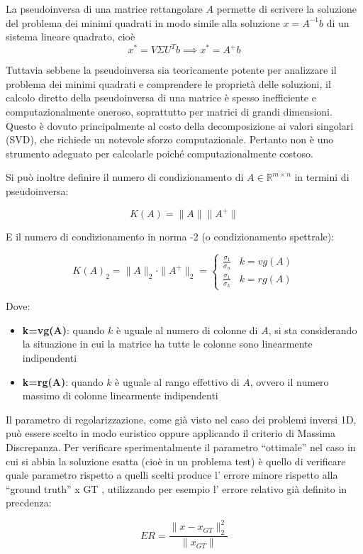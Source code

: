 La pseudoinversa di una matrice rettangolare $A$ permette di scrivere la soluzione del problema dei minimi quadrati in modo simile alla soluzione $x=A^{-1}b$ di un sistema lineare quadrato, cioè
\[
    x^* = V\Sigma U^T b \implies x^* = A^+ b
\]

Tuttavia sebbene la pseudoinversa sia teoricamente potente per analizzare il problema dei minimi quadrati e comprendere le proprietà delle soluzioni, il calcolo diretto della pseudoinversa di una matrice è spesso inefficiente e computazionalmente oneroso, soprattutto per matrici di grandi dimensioni. Questo è dovuto principalmente al costo della decomposizione ai valori singolari (SVD), che richiede un notevole sforzo computazionale. Pertanto non è uno strumento adeguato per calcolarle poiché computazionalmente costoso.

Si può inoltre definire il numero di condizionamento di $A \in \mathbb{R}^{m\times n}$ in termini di pseudoinversa:

\[
    K(A)  = \|A\|\|A^+\|
\]
 
E il numero di condizionamento in norma -2 (o condizionamento spettrale):

\[
    K(A)_2 = \|A\|_2 \cdot \| A^+\|_2 = \begin{cases}
        \frac{\sigma_1}{\sigma_n} & k = vg (A) \\
        \frac{\sigma_1}{\sigma_k} & k = rg(A)
    \end{cases}
\]

Dove: 
\begin{itemize}
    \item \textbf{k=vg(A)}: quando $k$ è uguale al numero di colonne di $A$, si sta considerando la situazione in cui la matrice ha tutte le colonne sono linearmente indipendenti
    \item \textbf{k=rg(A)}: quando $k$ è uguale al rango effettivo di $A$, ovvero il numero massimo di colonne linearmente indipendenti
\end{itemize}

Il parametro di regolarizzazione, come già visto nel caso dei problemi inversi 1D, può
essere scelto in modo euristico oppure applicando il criterio di Massima Discrepanza.
Per verificare sperimentalmente il parametro “ottimale” nel caso in cui si abbia la
soluzione esatta (cioè in un problema test) è quello di verificare quale parametro
rispetto a quelli scelti produce l’ errore minore rispetto alla “ground truth” x GT ,
utilizzando per esempio l’ errore relativo già definito in precdenza:

\[
    ER = \frac{\|x-x_{GT}\|_2^2}{\|x_{GT}\|}    
\]